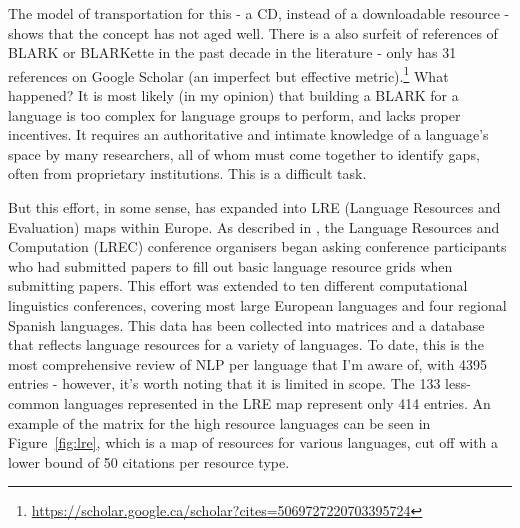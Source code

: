 The model of transportation for this - a CD, instead of a downloadable resource - shows that the concept has not aged well. There is a also surfeit of references of BLARK or BLARKette in the past decade in the literature - \citet{krauwer1998elsnet} only has 31 references on Google Scholar (an imperfect but effective metric).\footnote{\href{https://scholar.google.ca/scholar?cites=5069727220703395724}{https://scholar.google.ca/scholar?cites=5069727220703395724}} What happened? It is most likely (in my opinion) that building a BLARK for a language is too complex for language groups to perform, and lacks proper incentives. It requires an authoritative and intimate knowledge of a language's space by many researchers, all of whom must come together to identify gaps, often from proprietary institutions. This is a difficult task.

But this effort, in some sense, has expanded into LRE (Language Resources and Evaluation) maps within Europe. As described in \citet{calzolari2010lrec, del2014lremap, mariani2015language, del2015visualising}, the Language Resources and Computation (LREC) conference organisers began asking conference participants who had submitted papers to fill out basic language resource grids when submitting papers. This effort was extended to ten different computational linguistics conferences, covering most large European languages and four regional Spanish languages. This data has been collected into matrices and a database that reflects language resources for a variety of languages. To date, this is the most comprehensive review of NLP per language that I'm aware of, with 4395 entries - however, it's worth noting that it is limited in scope. The 133 less-common languages represented in the LRE map represent only 414 entries. An example of the matrix for the high resource languages can be seen in Figure~\ref{fig:lre}, which is a map of resources for various languages, cut off with a lower bound of 50 citations per resource type.


